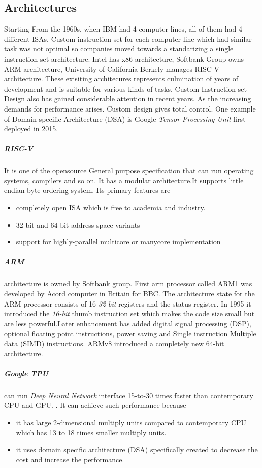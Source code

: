 \documentclass[a4paper,12pt]{article}
\begin{document}
    \subsection{Architectures}
    Starting From the 1960s, when IBM had 4 computer lines, all of them had 4 different ISAs. Custom instruction set for each computer line which had similar task was not optimal so companies moved towards a standarizing a single instruction set architecture. Intel has x86 architecture, Softbank Group owns ARM architecture, University of California Berkely manages RISC-V architecture. These exisiting architecures represents culmination of years of development and is suitable for various kinds of tasks.
    Custom Instruction set Design also has gained considerable attention in recent years. As the increasing demands for performance arises. Custom design gives total control. One example of Domain specific Architecture (DSA) is Google \textit{ Tensor Processing Unit} first deployed in 2015. 
    \subparagraph{RISC-V}
    It is one of the opensource General purpose specification that can run operating systems, compilers and so on. It has a modular architecture.It supports little endian byte ordering system. Its primary features are
    \begin{itemize}
        \item  completely open ISA which is free to academia and industry.
        \item 32-bit and 64-bit address space variants
        \item support for highly-parallel multicore or manycore implementation
    \end{itemize}
    \subparagraph{ARM}
     architecture is owned by Softbank group. First arm processor called ARM1 was developed by Acord computer in Britain for BBC. The architecture state for the ARM processor consists of 16 \textit{32-bit} registers and the status register. In 1995 it introduced the \textit{16-bit} thumb instruction set which makes the code size small but are less powerful.Later enhancement has added digital signal processing (DSP), optional floating point instructions, power saving and Single instruction Multiple data (SIMD) instructions. ARMv8 introduced a completely new 64-bit architecture. 

    \subparagraph{Google TPU}
    can run \textit{Deep Neural Network} interface 15-to-30 times faster  than contemporary CPU and GPU. \citebib{}. It can achieve such performance because
    \begin{itemize}
        \item it has large 2-dimensional multiply units compared to contemporary CPU which has 13 to 18 times smaller multiply units.
        \item it uses domain specific architecture (DSA) specifically created to decrease the cost and increase the performance. 
    \end{itemize}
\end{document}
